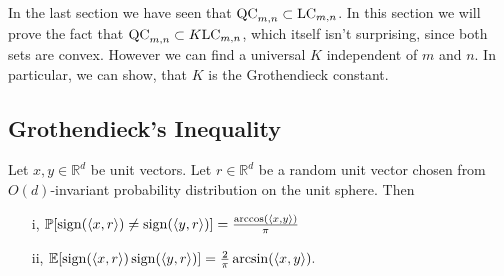In the last section we have seen that $\textup{QC}_{m,n}\subset \textup{LC}_{m,n}$. In this section we will prove the fact that $\textup{QC}_{m,n}\subset K\textup{LC}_{m,n}$, which itself isn't surprising, since both sets are convex. However we can find a universal $K$ independent of $m$ and $n$. In particular, we can show, that $K$ is the Grothendieck constant. 

\subsection{Grothendieck's Inequality}
	\begin{lemma}\label{lem:G_id}
		Let $x,y\in\mathbb{R}^d$ be unit vectors. Let $r\in\mathbb{R}^d$ be a random unit vector chosen from $O(d)$-invariant probability distribution on the unit sphere. Then
		\begin{enumerate}
			\item[i,] $\mathbb{P}[\operatorname{sign}(\langle{x},{r}\rangle)\neq\operatorname{sign}(\langle{y},{r}\rangle)]=\frac{\arccos(\langle{x},{y}\rangle)}{\pi}$
			\item[ii,] $\mathbb{E}[\operatorname{sign}(\langle{x},{r}\rangle)\operatorname{sign}(\langle{y},{r}\rangle)]=\frac{2}{\pi}\arcsin(\langle{x},{y}\rangle).$
		\end{enumerate}
	\end{lemma}
